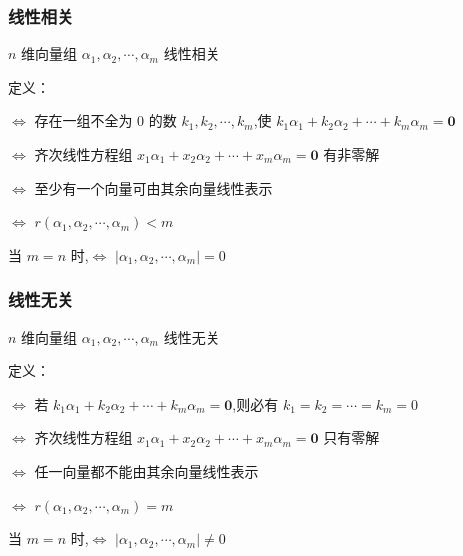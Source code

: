 \documentclass[UTF8]{ctexart}
\theoremstyle{remark}
\begin{document}
	\subsubsection{线性相关}
	\(n\) 维向量组 \(\alpha_1,\alpha_2,\cdots,\alpha_m\) 线性相关
	
	定义：
	
	\(\Leftrightarrow\) 存在一组不全为 \(0\) 的数 \(k_1,k_2,\cdots,k_m\),使 \(k_1\alpha_1 + k_2\alpha_2 + \cdots + k_m\alpha_m = \boldsymbol{0}\)
	
	\(\Leftrightarrow\) 齐次线性方程组 \(x_1\alpha_1 + x_2\alpha_2 + \cdots + x_m\alpha_m = \boldsymbol{0}\) 有非零解
	
	\(\Leftrightarrow\) 至少有一个向量可由其余向量线性表示
	
	\(\Leftrightarrow\) \(r(\alpha_1,\alpha_2,\cdots,\alpha_m) < m\)
	
	当 \(m = n\) 时,\(\Leftrightarrow\) \(|\alpha_1,\alpha_2,\cdots,\alpha_m| = 0\)
	
	\subsubsection{线性无关}
	\(n\) 维向量组 \(\alpha_1,\alpha_2,\cdots,\alpha_m\) 线性无关
	
	定义：
	
	\(\Leftrightarrow\) 若 \(k_1\alpha_1 + k_2\alpha_2 + \cdots + k_m\alpha_m = \boldsymbol{0}\),则必有 \(k_1 = k_2 = \cdots = k_m = 0\)
	
	\(\Leftrightarrow\) 齐次线性方程组 \(x_1\alpha_1 + x_2\alpha_2 + \cdots + x_m\alpha_m = \boldsymbol{0}\) 只有零解
	
	\(\Leftrightarrow\) 任一向量都不能由其余向量线性表示
	
	\(\Leftrightarrow\) \(r(\alpha_1,\alpha_2,\cdots,\alpha_m) = m\)
	
	当 \(m = n\) 时,\(\Leftrightarrow\) \(|\alpha_1,\alpha_2,\cdots,\alpha_m| \neq 0\)
	
\end{document}
